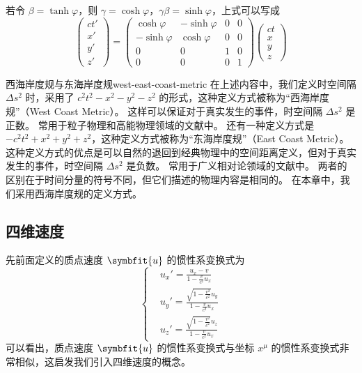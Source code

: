 若令 $\beta = \tanh \varphi$，则 $\gamma = \cosh \varphi$，$\gamma \beta = \sinh \varphi$，上式可以写成
\begin{equation}
    \begin{pmatrix}
        ct' \\
        x'  \\
        y'  \\
        z'
    \end{pmatrix} = \begin{pmatrix}
        \cosh \varphi  & -\sinh \varphi & 0 & 0 \\
        -\sinh \varphi & \cosh \varphi  & 0 & 0 \\
        0              & 0              & 1 & 0 \\
        0              & 0              & 0 & 1
    \end{pmatrix} \begin{pmatrix}
        ct \\
        x  \\
        y  \\
        z
    \end{pmatrix}
\end{equation}

\begin{note}{西海岸度规与东海岸度规}{west-east-coast-metric}
    在上述内容中，我们定义时空间隔 $\Delta s^2$ 时，采用了 $c^2 t^2 - x^2 - y^2 - z^2$ 的形式，这种定义方式被称为“西海岸度规”（West Coast Metric）。
    这样可以保证对于真实发生的事件，时空间隔 $\Delta s^2$ 是正数。
    常用于粒子物理和高能物理领域的文献中。
    还有一种定义方式是 $-c^2 t^2 + x^2 + y^2 + z^2$，这种定义方式被称为“东海岸度规”（East Coast Metric）。
    这种定义方式的优点是可以自然的退回到经典物理中的空间距离定义，但对于真实发生的事件，时空间隔 $\Delta s^2$ 是负数。
    常用于广义相对论领域的文献中。
    两者的区别在于时间分量的符号不同，但它们描述的物理内容是相同的。
    在本章中，我们采用西海岸度规的定义方式。
\end{note}

\subsection{四维速度}

先前面定义的质点速度 $\symbfit{u}$ 的惯性系变换式为
\begin{equation}
    \left\{
    \begin{aligned}
         & u_x' = \frac{u_x - v}{1 - \frac{v}{c^2} u_x}                        \\
         & u_y' = \frac{\sqrt{1 - \frac{v^2}{c^2}} u_y}{1 - \frac{v}{c^2} u_x} \\
         & u_z' = \frac{\sqrt{1 - \frac{v^2}{c^2}} u_z}{1 - \frac{v}{c^2} u_x}
    \end{aligned}
    \right.
\end{equation}
可以看出，质点速度 $\symbfit{u}$ 的惯性系变换式与坐标 $x^\mu$ 的惯性系变换式非常相似，这启发我们引入四维速度的概念。

